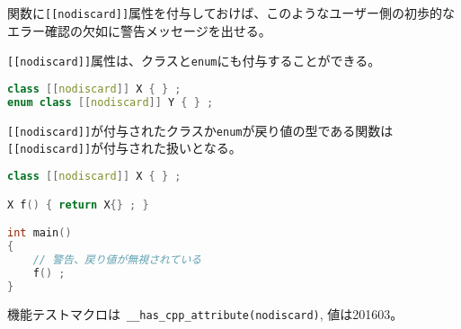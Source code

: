 関数に\lstinline![[nodiscard]]!属性を付与しておけば、このようなユーザー側の初歩的なエラー確認の欠如に警告メッセージを出せる。

\lstinline![[nodiscard]]!属性は、クラスと\lstinline!enum!にも付与することができる。

\begin{lstlisting}[language=C++]
class [[nodiscard]] X { } ;
enum class [[nodiscard]] Y { } ;
\end{lstlisting}

\lstinline![[nodiscard]]!が付与されたクラスか\lstinline!enum!が戻り値の型である関数は\lstinline![[nodiscard]]!が付与された扱いとなる。

\begin{lstlisting}[language=C++]
class [[nodiscard]] X { } ;

X f() { return X{} ; } 

int main()
{
    // 警告、戻り値が無視されている
    f() ;
}
\end{lstlisting}

機能テストマクロは~\lstinline!__has_cpp_attribute(nodiscard)!,
値は201603。
